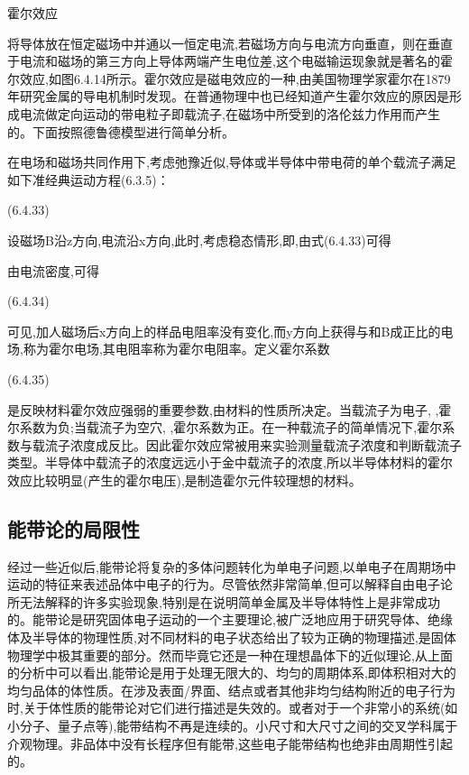 霍尔效应

将导体放在恒定磁场中并通以一恒定电流,若磁场方向与电流方向垂直，则在垂直于电流和磁场的第三方向上导体两端产生电位差,这个电磁输运现象就是著名的霍尔效应,如图6.4.14所示。霍尔效应是磁电效应的一种,由美国物理学家霍尔在1879年研究金属的导电机制时发现。在普通物理中也已经知道产生霍尔效应的原因是形成电流做定向运动的带电粒子即载流子,在磁场中所受到的洛伦兹力作用而产生的。下面按照德鲁德模型进行简单分析。

在电场和磁场共同作用下,考虑弛豫近似,导体或半导体中带电荷的单个载流子满足如下准经典运动方程(6.3.5)：

 	(6.4.33)

设磁场B沿z方向,电流沿x方向,此时,考虑稳态情形,即,由式(6.4.33)可得



由电流密度,可得

 	(6.4.34)

可见,加人磁场后x方向上的样品电阻率没有变化,而y方向上获得与和B成正比的电场,称为霍尔电场,其电阻率称为霍尔电阻率。定义霍尔系数

	 (6.4.35)

是反映材料霍尔效应强弱的重要参数,由材料的性质所决定。当载流子为电子, ,霍尔系数为负;当载流子为空穴, ,霍尔系数为正。在一种载流子的简单情况下,霍尔系数与载流子浓度成反比。因此霍尔效应常被用来实验测量载流子浓度和判断载流子类型。半导体中载流子的浓度远远小于金中载流子的浓度,所以半导体材料的霍尔效应比较明显(产生的霍尔电压),是制造霍尔元件较理想的材料。



\subsection{能带论的局限性}

经过一些近似后,能带论将复杂的多体问题转化为单电子问题,以单电子在周期场中运动的特征来表述品体中电子的行为。尽管依然非常简单,但可以解释自由电子论所无法解释的许多实验现象,特别是在说明简单金属及半导体特性上是非常成功的。能带论是研究固体电子运动的一个主要理论,被广泛地应用于研究导体、绝缘体及半导体的物理性质,对不同材料的电子状态给出了较为正确的物理描述,是固体物理学中极其重要的部分。然而毕竟它还是一种在理想晶体下的近似理论,从上面的分析中可以看出,能带论是用于处理无限大的、均匀的周期体系,即体积相对大的均匀品体的体性质。在涉及表面/界面、结点或者其他非均匀结构附近的电子行为时,关于体性质的能带论对它们进行描述是失效的。或者对于一个非常小的系统(如小分子、量子点等),能带结构不再是连续的。小尺寸和大尺寸之间的交叉学科属于介观物理。非品体中没有长程序但有能带,这些电子能带结构也绝非由周期性引起的。


